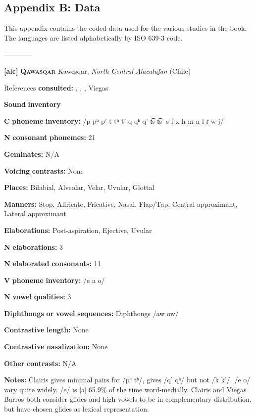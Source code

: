 
\subsection{Appendix B: Data}
\begin{styleBody}
This appendix contains the coded data used for the various studies in the book. The languages are listed alphabetically by ISO 639-3 code.

————

\textbf{[alc]}   \textbf{\textsc{Qawasqar}}  Kawesqar, \textit{North} \textit{Central} \textit{Alacalufan} (Chile)

References \textbf{consulted:} \citet{Aguilera2001}, \citet{Clairis1977}, \citet{Clairis1985}, Viegas \citet{Barros1990}

\textbf{Sound} \textbf{inventory}

\textbf{C} \textbf{phoneme} \textbf{inventory:} /p pʰ p’ t tʰ t’ q qʰ q’ t͡s t͡s’ s f x h m n l ɾ w j/

\textbf{N} \textbf{consonant} \textbf{phonemes:} 21

\textbf{Geminates:} N/A

\textbf{Voicing} \textbf{contrasts:} None

\textbf{Places:} Bilabial, Alveolar, Velar, Uvular, Glottal

\textbf{Manners:} Stop, Affricate, Fricative, Nasal, Flap/Tap, Central approximant, Lateral approximant

\textbf{Elaborations:} Post-aspiration, Ejective, Uvular

\textbf{N} \textbf{elaborations:} 3

\textbf{N} \textbf{elaborated} \textbf{consonants:} 11

\textbf{V} \textbf{phoneme} \textbf{inventory:} /e a o/

\textbf{N} \textbf{vowel} \textbf{qualities:} 3

\textbf{Diphthongs} \textbf{or} \textbf{vowel} \textbf{sequences:} Diphthongs /aw ow/

\textbf{Contrastive} \textbf{length:} None

\textbf{Contrastive} \textbf{nasalization:} None

\textbf{Other} \textbf{contrasts:} N/A

\textbf{Notes:} Clairis gives minimal pairs for /pʰ tʰ/, gives /q’ qʰ/ but not /k k’/. /e o/ vary quite widely. /e/ is [ə] 65.9\% of the time word-medially. Clairis and Viegas Barros both consider glides and high vowels to be in complementary distribution, but have chosen glides as lexical representation.


\end{styleBody}
